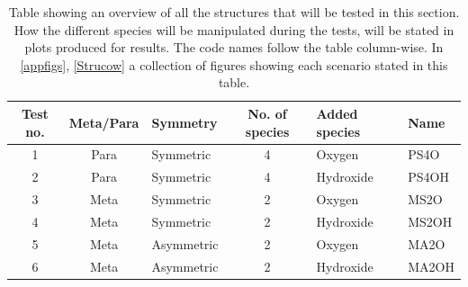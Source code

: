 \begin{table}[ht]
\begin{tabular}{cclcll}
		\toprule
		Test no. & Meta/Para & Symmetry   & No. of species & Added species & Name  \\ \midrule
		1        & Para      & Symmetric  & 4              & Oxygen        & PS4O  \\
		2        & Para      & Symmetric  & 4              & Hydroxide     & PS4OH \\
		3        & Meta      & Symmetric  & 2              & Oxygen        & MS2O  \\
		4        & Meta      & Symmetric  & 2              & Hydroxide     & MS2OH \\
		5        & Meta      & Asymmetric & 2              & Oxygen        & MA2O  \\
		6        & Meta      & Asymmetric & 2              & Hydroxide     & MA2OH \\
		\bottomrule
	\end{tabular}
	\caption{Table showing an overview of all the structures that will be tested in this section.  How the different species will be manipulated during the tests, will be stated in plots produced for results. The code names follow the table column-wise. In \cref{appfigs}, \cref{Strucow} a collection of figures showing each scenario stated in this table.}
\label{testtable}
\end{table}
